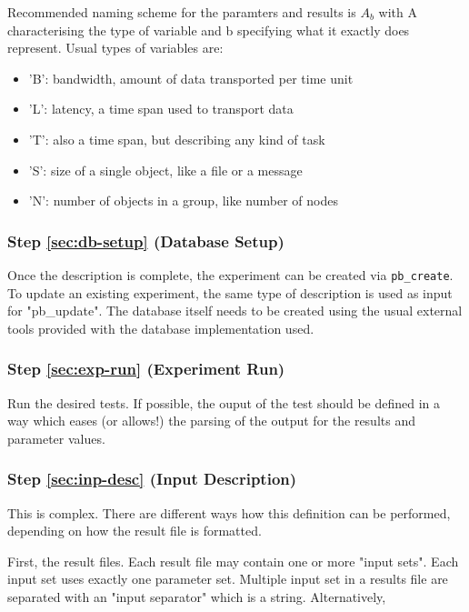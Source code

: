 \documentclass[12pt,a4paper]{article}
\begin{document}
   Recommended naming scheme for the paramters and results is $A_b$ with
   A characterising the type of variable and b specifying what it
   exactly does represent. Usual types of variables are: 
   \begin{itemize}
   \item 'B': bandwidth, amount of data transported per time unit
   \item 'L': latency, a time span used to transport data
   \item 'T': also a time span, but describing any kind of task
   \item 'S': size of a single object, like a file or a message
   \item 'N': number of objects in a group, like number of nodes
   \end{itemize}
   
\subsubsection{Step \ref{sec:db-setup} (Database Setup)}
   Once the description is complete, the experiment can be created
   via \texttt{pb\_create}. To update an existing experiment, the same type
   of description is used as input for "pb\_update". The database
   itself needs to be created using the usual external tools provided
   with the database implementation used.

\subsubsection{Step \ref{sec:exp-run} (Experiment Run)}
   Run the desired tests. If possible, the ouput of the test should be
   defined in a way which eases (or allows!) the parsing of the output
   for the results and parameter values.

\subsubsection{Step \ref{sec:inp-desc} (Input Description)}
   This is complex. There are different ways how this definition can be 
   performed, depending on how the result file is formatted.
   
   First, the result files. Each result file may contain one or more
   "input sets". Each input set uses exactly one parameter set. Multiple
   input set in a results file are separated with an "input separator"
   which is a string. Alternatively, 
\end{document}
